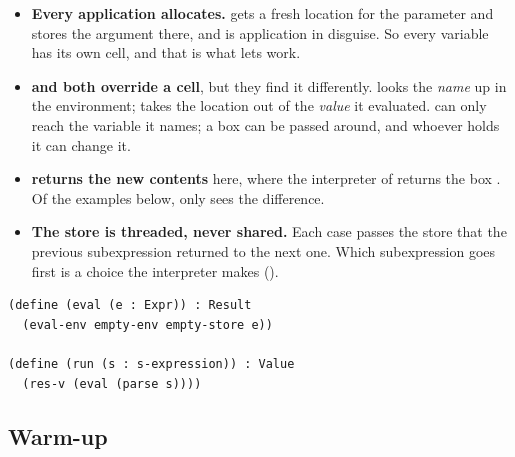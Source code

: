 \begin{itemize}
  \item \textbf{Every application allocates.}  gets a fresh location for the parameter and stores the argument there, and  is application in disguise. So every variable has its own cell, and that is what lets  work.
  \item \textbf{ and  both override a cell}, but they find it differently.  looks the \emph{name} up in the environment;  takes the location out of the \emph{value} it evaluated.  can only reach the variable it names; a box can be passed around, and whoever holds it can change it.
  \item \textbf{ returns the new contents}  here, where the interpreter of  returns the box . Of the examples below, only  sees the difference.
  \item \textbf{The store is threaded, never shared.} Each case passes the store that the previous subexpression returned to the next one. Which subexpression goes first is a choice the interpreter makes ().
\end{itemize}
\begin{lstlisting}
(define (eval (e : Expr)) : Result
  (eval-env empty-env empty-store e))

(define (run (s : s-expression)) : Value
  (res-v (eval (parse s))))
\end{lstlisting}

\subsection{Warm-up}

